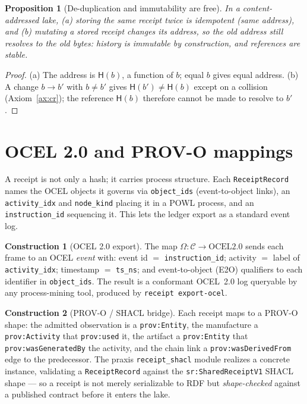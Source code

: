 \documentclass[11pt,oneside]{book}
\theoremstyle{definition}
\newtheorem{construction}{Construction}[chapter]
\theoremstyle{plain}
\newtheorem{proposition}[theorem]{Proposition}
\theoremstyle{remark}
\newcommand{\chainH}{\mathsf{H}}               %
\newcommand{\code}[1]{\texttt{#1}}
\newcommand{\Ledger}{\mathcal{C}}               %
\begin{document}
\begin{proposition}[De-duplication and immutability are free]\label{prop:cas}
In a content-addressed lake, (a) storing the same receipt twice is idempotent (same address),
and (b) mutating a stored receipt changes its address, so the old address still resolves to the
old bytes: history is immutable by construction, and references are stable.
\end{proposition}

\begin{proof}
(a) The address is $\chainH(b)$, a function of $b$; equal $b$ gives equal address. (b) A change
$b\to b'$ with $b\ne b'$ gives $\chainH(b')\ne\chainH(b)$ except on a collision
(Axiom~\ref{ax:cr}); the reference $\chainH(b)$ therefore cannot be made to resolve to $b'$.
\end{proof}

\section{OCEL 2.0 and PROV-O mappings}

A receipt is not only a hash; it carries process structure. Each \code{ReceiptRecord} names the
OCEL objects it governs via \code{object\_ids} (event-to-object links), an \code{activity\_idx}
and \code{node\_kind} placing it in a POWL process, and an \code{instruction\_id} sequencing it.
This lets the ledger export as a standard event log.

\begin{construction}[OCEL 2.0 export]\label{con:ocel}
The map $\Omega:\Ledger\to\mathrm{OCEL2.0}$ sends each frame to an OCEL \emph{event} with:
event id $=$ \code{instruction\_id}; activity $=$ label of \code{activity\_idx}; timestamp
$=$ \code{ts\_ns}; and event-to-object (E2O) qualifiers to each identifier in
\code{object\_ids}. The result is a conformant OCEL~2.0 log queryable by any process-mining
tool, produced by \code{receipt export-ocel}.
\end{construction}

\begin{construction}[PROV-O / SHACL bridge]\label{con:provo}
Each receipt maps to a PROV-O~\cite{provo} shape: the admitted observation is a
\code{prov:Entity}, the manufacture a \code{prov:Activity} that \code{prov:used} it, the
artifact a \code{prov:Entity} that \code{prov:wasGeneratedBy} the activity, and the chain link
a \code{prov:wasDerivedFrom} edge to the predecessor. The praxis \code{receipt\_shacl} module
realizes a concrete instance, validating a \code{ReceiptRecord} against the
\code{sr:SharedReceiptV1} SHACL shape --- so a receipt is not merely serializable to RDF but
\emph{shape-checked} against a published contract before it enters the lake.
\end{construction}
\end{document}

